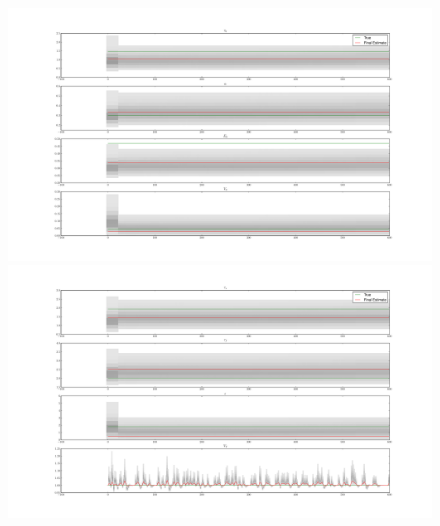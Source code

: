 \begin{figure}[H]
\centering
\subfigure
{\includegraphics[clip=true,trim=7cm 3cm 6cm 3cm, width=\textwidth]{images/justnoise_hist_1}}
\subfigure
{\includegraphics[clip=true,trim=7cm 3cm 6cm 3cm, width=\textwidth]{images/justnoise_hist_2}}
\end{figure}

